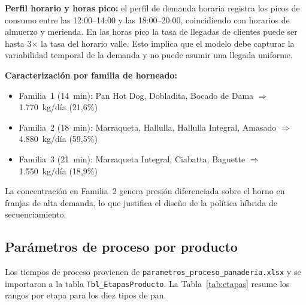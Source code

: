 \documentclass[12pt]{article}
\begin{document}
\textbf{Perfil horario y horas pico:} el perfil de demanda horaria registra los picos de consumo entre las 12:00--14:00 y las 18:00--20:00, coincidiendo con horarios de almuerzo y merienda. En las horas pico la tasa de llegadas de clientes puede ser hasta 3$\times$ la tasa del horario valle. Esto implica que el modelo debe capturar la variabilidad temporal de la demanda y no puede asumir una llegada uniforme.

\textbf{Caracterización por familia de horneado:}
\begin{itemize}
  \item Familia~1 (14~min): Pan Hot Dog, Dobladita, Bocado de Dama $\Rightarrow$ 1.770~kg/día (21,6\%)
  \item Familia~2 (18~min): Marraqueta, Hallulla, Hallulla Integral, Amasado $\Rightarrow$ 4.880~kg/día (59,5\%)
  \item Familia~3 (21~min): Marraqueta Integral, Ciabatta, Baguette $\Rightarrow$ 1.550~kg/día (18,9\%)
\end{itemize}

La concentración en Familia~2 genera presión diferenciada sobre el horno en franjas de alta demanda, lo que justifica el diseño de la política híbrida de secuenciamiento.

\subsection{Parámetros de proceso por producto}

Los tiempos de proceso provienen de \texttt{parametros\_proceso\_panaderia.xlsx} y se importaron a la tabla \texttt{Tbl\_EtapasProducto}. La Tabla~\ref{tab:etapas} resume los rangos por etapa para los diez tipos de pan.
\end{document}
